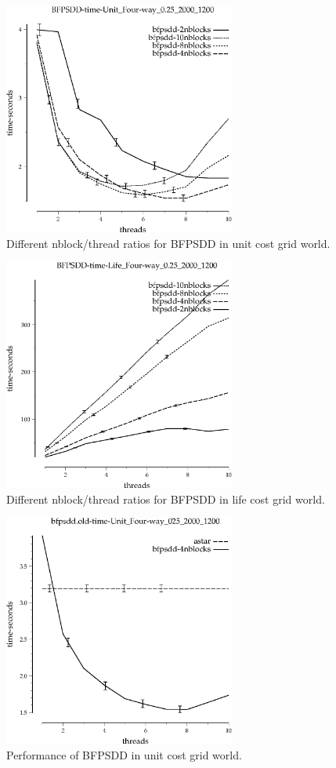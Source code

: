 \documentclass{article}
\begin{document}
\begin{figure}[h!]
\includegraphics[width=3in]{../graphs/grid_unit_four-way_0.25_2000_1200/BFPSDD-time-Unit_Four-way_0.25_2000_1200.eps}
\caption{Different nblock/thread ratios for BFPSDD in unit cost grid world.}
\label{fig:BFPSDD-nblock-grid}
\end{figure}

\begin{figure}[h!]
\includegraphics[width=3in]{../graphs/grid_life_four-way_0.25_2000_1200/BFPSDD-time-Life_Four-way_0.25_2000_1200.eps}
\caption{Different nblock/thread ratios for BFPSDD in life cost grid world.}
\label{fig:BFPSDD-nblock-life}
\end{figure}

\begin{figure}[h!]
\includegraphics[width=3in]{../graphs/seth/grid-unit-single/BFPSDD.eps}
\caption{Performance of BFPSDD in unit cost grid world.}
\label{fig:BFPSDD-grid}
\end{figure}
\end{document}
